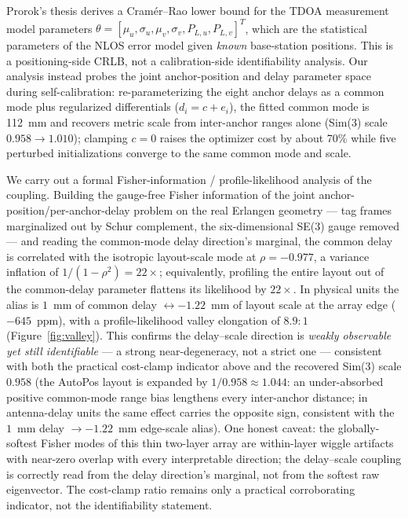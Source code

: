 \documentclass[11pt,a4paper]{article}
\begin{document}
Prorok's thesis \citep{prorok_2013_models_algorithms_uwb_localization_thesis}
derives a Cram\'{e}r--Rao lower bound for the TDOA measurement model parameters
$\theta = [\mu_u, \sigma_u, \mu_v, \sigma_v, P_{L,u}, P_{L,v}]^T$, which are the
statistical parameters of the NLOS error model given \emph{known} base-station
positions. This is a positioning-side CRLB, not a calibration-side identifiability
analysis. Our analysis instead probes the joint anchor-position and delay parameter
space during self-calibration: re-parameterizing the eight anchor delays as a common
mode plus regularized differentials ($d_i = c + e_i$), the fitted common mode is
112~mm and recovers metric scale from inter-anchor ranges alone
(Sim(3) scale $0.958 \to 1.010$); clamping $c = 0$ raises the optimizer cost by
about 70\% while five perturbed initializations converge to the same common mode
and scale.

We carry out a formal Fisher-information / profile-likelihood analysis of the coupling. Building the gauge-free Fisher
information of the joint anchor-position/per-anchor-delay problem on the real Erlangen
geometry --- tag frames marginalized out by Schur complement, the six-dimensional
SE(3) gauge removed --- and reading the common-mode delay direction's marginal, the
common delay is correlated with the isotropic layout-scale mode at $\rho=-0.977$, a
variance inflation of $1/(1-\rho^2)=22\times$; equivalently, profiling the entire
layout out of the common-delay parameter flattens its likelihood by $22\times$. In
physical units the alias is $1$~mm of common delay $\leftrightarrow -1.22$~mm of layout
scale at the array edge ($-645$~ppm), with a profile-likelihood valley elongation of
$8.9{:}1$ (Figure~\ref{fig:valley}). This confirms the delay--scale direction is
\emph{weakly observable yet still identifiable} --- a strong near-degeneracy, not a
strict one --- consistent with both the practical cost-clamp indicator above and the
recovered Sim(3) scale $0.958$ (the AutoPos layout is expanded by $1/0.958\approx1.044$: an under-absorbed positive common-mode range bias lengthens every inter-anchor distance; in antenna-delay units the same effect carries the opposite sign, consistent with the $1$~mm delay $\to -1.22$~mm edge-scale alias). One honest caveat: the globally-softest Fisher modes of this thin
two-layer array are within-layer wiggle artifacts with near-zero overlap with every
interpretable direction; the delay--scale coupling is correctly read from the delay
direction's marginal, not from the softest raw eigenvector. The cost-clamp ratio
remains only a practical corroborating indicator, not the identifiability statement.
\end{document}
